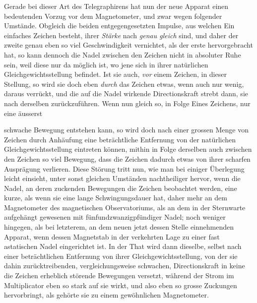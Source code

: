 Gerade bei dieser Art des Telegraphirens hat nun der neue Apparat einen bedeutenden Vorzug vor dem Magnetometer, und zwar wegen folgender Umstände. Obgleich die beiden entgegengesetzten Impulse, aus welchen Ein einfaches Zeichen besteht, ihrer \textit{Stärke} nach \textit{genau gleich} sind, und daher der zweite genau eben so viel Geschwindigkeit vernichtet, als der erste hervorgebracht hat, so kann dennoch die Nadel zwischen den Zeichen nicht in absoluter Ruhe sein, weil diese nur da möglich ist, wo jene sich in ihrer natürlichen Gleichgewichtsstellung befindet. Ist sie auch, \textit{vor} einem Zeichen, in dieser Stellung, so wird sie doch eben \textit{durch} das Zeichen etwas, wenn auch nur wenig, daraus verrückt, und die auf die Nadel wirkende Directionskraft strebt dann, sie nach derselben zurückzuführen. Wenn nun gleich so, in Folge Eines Zeichens, nur eine äusserst
\GaussVSourceGathering{47\textsuperscript{*}}
\par\clearpage
{}
\noindent schwache Bewegung entstehen kann, so wird doch nach einer grossen Menge von Zeichen durch Anhäufung eine beträchtliche Entfernung von der natürlichen Gleichgewichtsstellung eintreten können, mithin in Folge derselben auch zwischen den Zeichen so viel Bewegung, dass die Zeichen dadurch etwas von ihrer scharfen Ausprägung verlieren. Diese Störung tritt nun, wie man bei einiger Überlegung leicht einsieht, unter sonst gleichen Umständen nachtheiliger hervor, wenn die Nadel, an deren zuckenden Bewegungen die Zeichen beobachtet werden, eine kurze, als wenn sie eine lange Schwingungsdauer hat, daher mehr an dem Magnetometer des magnetischen Observatoriums, als an dem in der Sternwarte aufgehängt gewesenen mit fünfundzwanzigpfündiger Nadel; noch weniger hingegen, als bei letzterem, an dem neuen jetzt dessen Stelle einnehmenden Apparat, wenn dessen Magnetstab in der verkehrten Lage zu einer fast astatischen Nadel eingerichtet ist. In der That wird dann dieselbe, selbst nach einer beträchtlichen Entfernung von ihrer Gleichgewichtsstellung, von der sie dahin zurücktreibenden, vergleichungsweise schwachen, Directionskraft in keine die Zeichen erheblich störende Bewegungen versetzt, während der Strom im Multiplicator eben so stark auf sie wirkt, und also eben so grosse Zuckungen hervorbringt, als gehörte sie zu einem gewöhnlichen Magnetometer.

